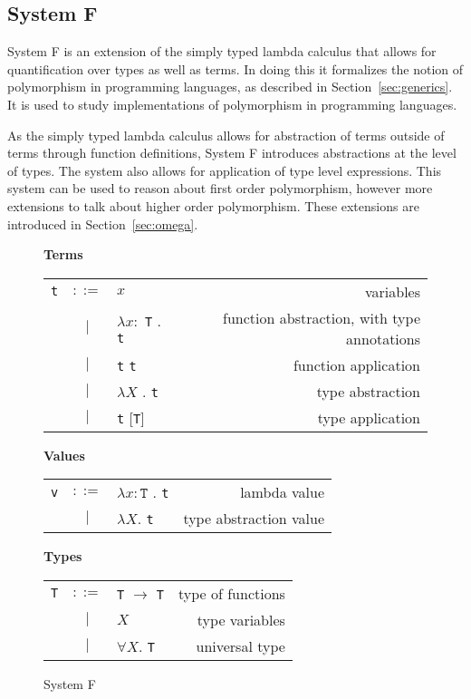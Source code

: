 \subsection{System F}\label{sec:systemF}
System F is an extension of the simply typed lambda calculus \cite{tapl} that
allows for quantification over types as well as terms. In doing this it
formalizes the notion of polymorphism in programming languages, as described in
Section~\ref{sec:generics}. It is used to study implementations of polymorphism
in programming languages.

As the simply typed lambda calculus allows for abstraction of terms outside of
terms through function definitions, System F introduces abstractions at the
level of types. The system also allows for application of type level
expressions. This system can be used to reason about first order polymorphism,
however more extensions to talk about higher order polymorphism. These extensions
are introduced in Section~\ref{sec:omega}.

\begin{figure}[H]\label{fig:systemF}
    \vspace{1cm}
    \textbf{Terms} \\
    \begin{tabular}{l c p{3cm} r}
        \texttt{t} & $ ::= $ & $ x $ &                   variables \\
      & $ | $ & $ \lambda x : $ \texttt{T} . \texttt{t} &          function abstraction, with type annotations \\
      & $ | $ & \texttt{t} \texttt{t} &          function application \\
      & $ | $ & $ \lambda X $ . \texttt{t} &          type abstraction \\
      & $ | $ & \texttt{t} [\texttt{T}] &          type application \\
    \end{tabular}

    \vspace{1cm}
    \textbf{Values} \\
    \begin{tabular}{l c p{3cm} r}
        \texttt{v} & $ ::= $ & $ \lambda x : \texttt{T} $ . \texttt{t} &                   lambda value \\
      & $ | $ & $ \lambda X . $ \texttt{t} &   type abstraction value \\
    \end{tabular}

    \vspace{1cm}
    \textbf{Types} \\
    \begin{tabular}{l c p{3cm} r}
        \texttt{T} & $ ::= $ & \texttt{T} $ \rightarrow $ \texttt{T} &      type of functions \\
        & $ | $ & $ X $ &       type variables \\
        & $ | $ & $ \forall X . $ \texttt{T} &       universal type \\
    \end{tabular}

    \caption{System F}
\end{figure}

